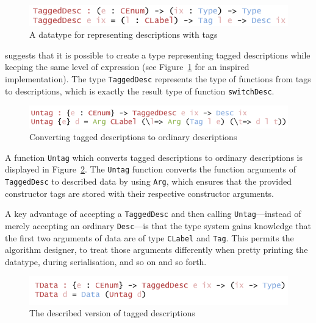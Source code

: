 \documentclass{ituthesis}
\newcommand{\ttconstructor}[1]{\textcolor{constructor-color}{\texttt{#1}}}
\newcommand{\tttype}[1]{\textcolor{type-color}{\texttt{#1}}}
\newcommand{\ttdec}[1]{\textcolor{declared-var-color}{\texttt{#1}}}
\theoremstyle{break}
\begin{document}
\begin{figure}[ht]
\begin{center}
    \includegraphics[scale=0.5]{Figures/TaggingDescriptions.png}
\end{center}
\caption{A datatype for representing descriptions with tags}
\label{fig:tagdesc}
\end{figure}

\textcite{Dagand2013acosmology} suggests that it is possible to create a type representing tagged descriptions while keeping
the same level of expression (see Figure~\ref{fig:tagdesc} for an inspired implementation).
The type \ttdec{TaggedDesc} represents the type of functions from tags to descriptions, which is exactly the result type of function \ttdec{switchDesc}.

\begin{figure}[ht]
\begin{center}
    \includegraphics[scale=0.5]{Figures/DetaggingDescriptions.png}
\end{center}
\caption{Converting tagged descriptions to ordinary descriptions}
\label{fig:untagdesc}
\end{figure}

A function \ttdec{Untag} which converts tagged descriptions to ordinary descriptions is displayed in Figure~\ref{fig:untagdesc}.
The \ttdec{Untag} function converts the function arguments of \tttype{TaggedDesc} to described data by using \ttconstructor{Arg}, which ensures
that the provided constructor tags are stored with their respective constructor arguments.

A key advantage of accepting a \ttdec{TaggedDesc} and then calling \ttdec{Untag}---instead of merely accepting an ordinary \tttype{Desc}---is that the type system
gains knowledge that the first two arguments of data are of type \ttdec{CLabel} and \tttype{Tag}.
This permits the algorithm designer, to treat those arguments differently when pretty printing the datatype, during serialisation, and so on and so forth.

\begin{figure}[ht]
\begin{center}
    \includegraphics[scale=0.5]{Figures/TaggedDescriptionData.png}
\end{center}
\caption{The described version of tagged descriptions}
\label{fig:tagdata}
\end{figure}
\end{document}
